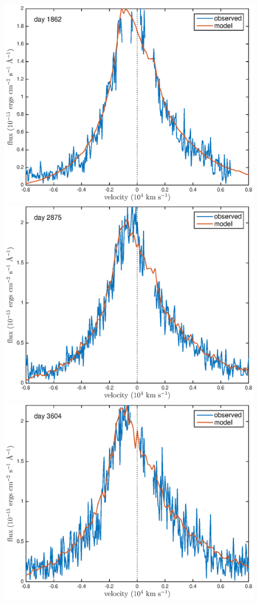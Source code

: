 \documentclass[useAMS,usenatbib,usegraphicx]{mnras}
\begin{document}
\begin{figure}

\includegraphics[trim =37 10 45 15,clip=true,scale=0.35]{clump_1/maximum/d1862Ha}
\includegraphics[trim =55 10 45 15,clip=true,scale=0.35]{clump_1/maximum/d2875Ha}
\includegraphics[trim =55 10 45 15,clip=true,scale=0.35]{clump_1/maximum/d3604Ha}

\end{figure}
\end{document}
